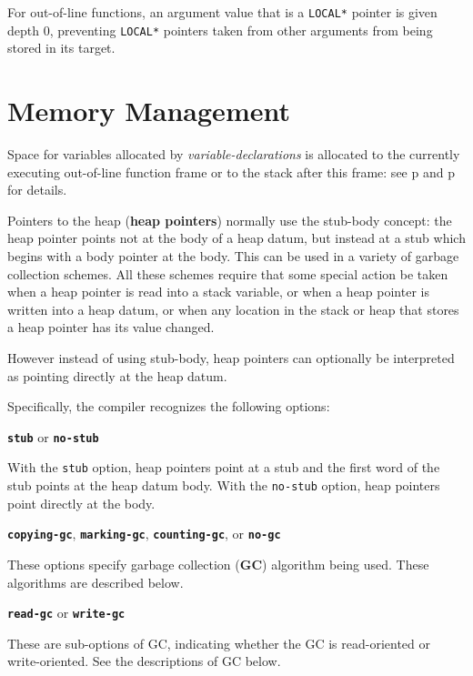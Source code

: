 \documentclass[12pt]{article}
\newcommand{\key}[1]{{\rm \bfseries #1}}
\newcommand{\ttkey}[1]{{\tt \bfseries #1}}
\newcommand{\skey}[2]{{\rm \bfseries #1#2}}
\newcommand{\pagref}[1]{p\pageref{#1}}
\newenvironment{indpar}[1][0.3in]%
	{\begin{list}{}%
		     {\setlength{\itemsep}{0in}%
		      \setlength{\topsep}{0in}%
		      \setlength{\parsep}{1ex}%
		      \setlength{\labelwidth}{#1}%
		      \setlength{\leftmargin}{#1}%
		      \addtolength{\leftmargin}{\labelsep}}%
	 \item}%
	{\end{list}}
\begin{document}
For out-of-line functions, an argument value that is a
{\tt *LOCAL*} pointer is given depth 0, preventing {\tt *LOCAL*}
pointers taken from other arguments from being stored in its target.

\section{Memory Management}
\label{MEMORY-MANAGEMENT}

Space for variables allocated by {\em variable-declarations}
is allocated to the currently executing out-of-line function
frame or to the stack after this frame: see
\pagref{VARIABLE-ALLOCATION} and \pagref{LOOP-ALLOCATION}
for details.

Pointers to the heap (\skey{heap pointer}s) normally use the stub-body concept:
the heap pointer points not at the body of a heap datum, but instead at a
stub which begins with a body pointer at the body.  This can be
used in a variety of garbage collection schemes.  All these
schemes require that some special action be taken when a heap
pointer is read into a stack variable, or when
a heap pointer is written into a heap datum, or when any location
in the stack or heap that stores a heap pointer has its value
changed.

However instead of using stub-body, heap pointers can optionally be
interpreted as pointing directly at the heap datum.

Specifically, the compiler recognizes the following options:

\begin{indpar}

\ttkey{stub} or \ttkey{no-stub}
\begin{indpar}
With the {\tt stub} option, heap pointers point at a stub and the
first word of the stub points at the heap datum body.  With the
{\tt no-stub} option, heap pointers point directly at the body.
\end{indpar}

\ttkey{copying-gc}, \ttkey{marking-gc}, \ttkey{counting-gc}, or \ttkey{no-gc}
\begin{indpar}
These options specify garbage collection (\key{GC})
algorithm being used.  These algorithms are described below.
\end{indpar}

\ttkey{read-gc} or \ttkey{write-gc}
\begin{indpar}
These are sub-options of GC, indicating whether the GC is
read-oriented or write-oriented.  See the descriptions
of GC below.
\end{indpar}

\end{indpar}
\end{document}
